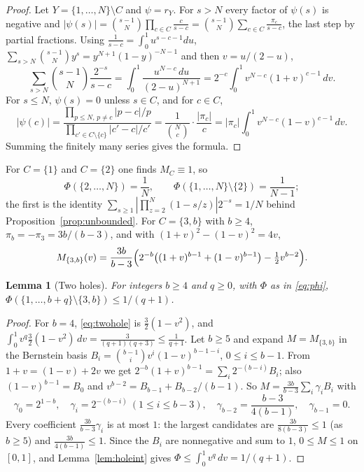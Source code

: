 \documentclass[11pt]{article}
\newtheorem{lemma}[theorem]{Lemma}
\begin{document}
\begin{proof}
Let $Y=\{1,\ldots,N\}\setminus C$ and $\psi=r_Y$.  For $s>N$ every factor of
$\psi(s)$ is negative and
$|\psi(s)|=\binom{s-1}N\prod_{c\in C}\frac c{s-c}=\binom{s-1}N\sum_{c\in C}\frac{\pi_c}{s-c}$,
the last step by partial fractions.  Using $\frac1{s-c}=\int_0^1u^{s-c-1}du$,
$\sum_{s>N}\binom{s-1}N y^s=y^{N+1}(1-y)^{-N-1}$ and then $v=u/(2-u)$,
\[
  \sum_{s>N}\binom{s-1}N\frac{2^{-s}}{s-c}
  =\int_0^1\frac{u^{N-c}\,du}{(2-u)^{N+1}}
  =2^{-c}\int_0^1v^{N-c}(1+v)^{c-1}\,dv .
\]
For $s\le N$, $\psi(s)=0$ unless $s\in C$, and for $c\in C$,
\[
  |\psi(c)|=\frac{\prod_{p\le N,\,p\ne c}|p-c|/p}{\prod_{c'\in C\setminus\{c\}}|c'-c|/c'}
  =\frac1{\binom Nc}\cdot\frac{|\pi_c|}c
  =|\pi_c|\int_0^1v^{N-c}(1-v)^{c-1}\,dv .
\]
Summing the finitely many series gives the formula.
\end{proof}

For $C=\{1\}$ and $C=\{2\}$ one finds $M_C\equiv1$, so
\begin{equation}\label{eq:onehole}
  \Phi(\{2,\ldots,N\})=\frac1N,\qquad
  \Phi(\{1,\ldots,N\}\setminus\{2\})=\frac1{N-1};
\end{equation}
the first is the identity
$\sum_{s\ge1}|\prod_{z=2}^N(1-s/z)|2^{-s}=1/N$ behind
Proposition~\ref{prop:unbounded}.  For $C=\{3,b\}$ with $b\ge4$,
$\pi_b=-\pi_3=3b/(b-3)$, and with $(1+v)^2-(1-v)^2=4v$,
\begin{equation}\label{eq:twohole}
  M_{\{3,b\}}(v)=\frac{3b}{b-3}\Bigl(2^{-b}\bigl((1+v)^{b-1}+(1-v)^{b-1}\bigr)
                   -\tfrac12v^{b-2}\Bigr).
\end{equation}

\begin{lemma}[Two holes]\label{lem:twohole}
For integers $b\ge4$ and $q\ge0$, with $\Phi$ as in \eqref{eq:phi},
$\Phi(\{1,\ldots,b+q\}\setminus\{3,b\})\le1/(q+1)$.
\end{lemma}

\begin{proof}
For $b=4$, \eqref{eq:twohole} is $\tfrac32(1-v^2)$, and
$\int_0^1v^q\tfrac32(1-v^2)\,dv=\frac3{(q+1)(q+3)}\le\frac1{q+1}$.  Let
$b\ge5$ and expand $M=M_{\{3,b\}}$ in the Bernstein basis
$B_i=\binom{b-1}iv^i(1-v)^{b-1-i}$, $0\le i\le b-1$.  From
$1+v=(1-v)+2v$ we get
$2^{-b}(1+v)^{b-1}=\sum_i2^{-(b-i)}B_i$; also $(1-v)^{b-1}=B_0$ and
$v^{b-2}=B_{b-1}+B_{b-2}/(b-1)$.  So $M=\frac{3b}{b-3}\sum_i\gamma_iB_i$ with
\[
  \gamma_0=2^{1-b},\quad
  \gamma_i=2^{-(b-i)}\ (1\le i\le b-3),\quad
  \gamma_{b-2}=\frac{b-3}{4(b-1)},\quad
  \gamma_{b-1}=0 .
\]
Every coefficient $\frac{3b}{b-3}\gamma_i$ is at most $1$: the largest
candidates are $\frac{3b}{8(b-3)}\le1$ (as $b\ge5$) and $\frac{3b}{4(b-1)}\le1$.
Since the $B_i$ are nonnegative and sum to $1$, $0\le M\le1$ on $[0,1]$, and
Lemma~\ref{lem:holeint} gives
$\Phi\le\int_0^1v^q\,dv=1/(q+1)$.
\end{proof}
\end{document}
